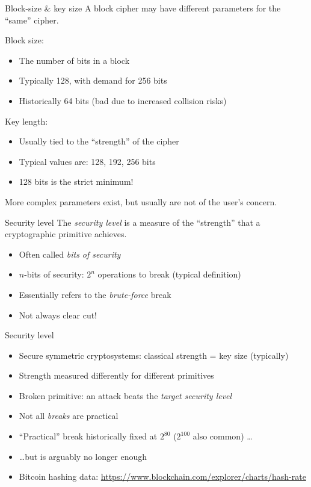 \begin{frame}{Block-size \& key size}
  A block cipher may have different parameters for the \enquote{same} cipher.

  \pause
  Block size:
  \begin{itemize}
    \item The number of bits in a block
    \pause
    \item Typically 128, with demand for 256 bits
    \item Historically 64 bits (bad due to increased collision risks)
  \end{itemize}

  \pause
  Key length:
  \begin{itemize}
    \item Usually tied to the \enquote{strength} of the cipher
    \pause
    \item Typical values are: 128, 192, 256 bits
    \item 128 bits is the strict minimum!
  \end{itemize}

  \pause
  More complex parameters exist, but usually are not of the user's concern.
\end{frame}

\begin{frame}{Security level}
  \pause
  The \emph{security level} is a measure of the \enquote{strength} that a cryptographic primitive achieves.

  \begin{itemize}[<+(1)->]
    \item Often called \emph{bits of security}
    \item $n$-bits of security: $2^n$ operations to break (typical definition)
    \item Essentially refers to the \emph{brute-force} break
    \item Not always clear cut!
  \end{itemize}
\end{frame}

\begin{frame}{Security level}
  \begin{itemize}[<+->]
    \item Secure symmetric cryptosystems: classical strength = key size (typically)
    \item Strength measured differently for different primitives
    \item Broken primitive: an attack beats the \emph{target security level}
    \item Not all \emph{breaks} are practical
    \item \enquote{Practical} break historically fixed at $2^{80}$ ($2^{100}$ also common) \dots
    \item \dots{}but is arguably no longer enough
    \item Bitcoin hashing data: \url{https://www.blockchain.com/explorer/charts/hash-rate}
  \end{itemize}
\end{frame}

